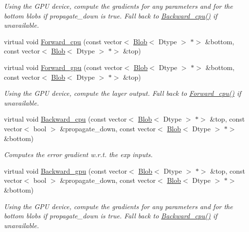 \begin{DoxyCompactItemize}
\begin{DoxyCompactList}\small\item\em Using the G\+PU device, compute the gradients for any parameters and for the bottom blobs if propagate\+\_\+down is true. Fall back to \mbox{\hyperlink{classcaffe_1_1_exp_layer_a3629dc4ebe692252f28edc204b8bf435}{Backward\+\_\+cpu()}} if unavailable. \end{DoxyCompactList}\item 
virtual void \mbox{\hyperlink{classcaffe_1_1_exp_layer_a5decf455b77628d5b2f996c26178153e}{Forward\+\_\+cpu}} (const vector$<$ \mbox{\hyperlink{classcaffe_1_1_blob}{Blob}}$<$ Dtype $>$ $\ast$$>$ \&bottom, const vector$<$ \mbox{\hyperlink{classcaffe_1_1_blob}{Blob}}$<$ Dtype $>$ $\ast$$>$ \&top)
\item 
\mbox{\label{classcaffe_1_1_exp_layer_a5e4d78781ca2c27bce9c45601ffdb2ca}} 
virtual void \mbox{\hyperlink{classcaffe_1_1_exp_layer_a5e4d78781ca2c27bce9c45601ffdb2ca}{Forward\+\_\+gpu}} (const vector$<$ \mbox{\hyperlink{classcaffe_1_1_blob}{Blob}}$<$ Dtype $>$ $\ast$$>$ \&bottom, const vector$<$ \mbox{\hyperlink{classcaffe_1_1_blob}{Blob}}$<$ Dtype $>$ $\ast$$>$ \&top)
\begin{DoxyCompactList}\small\item\em Using the G\+PU device, compute the layer output. Fall back to \mbox{\hyperlink{classcaffe_1_1_exp_layer_af623edf2518145ad490baebdda9efe92}{Forward\+\_\+cpu()}} if unavailable. \end{DoxyCompactList}\item 
virtual void \mbox{\hyperlink{classcaffe_1_1_exp_layer_a9228ea6cd838fb554552118265fe860a}{Backward\+\_\+cpu}} (const vector$<$ \mbox{\hyperlink{classcaffe_1_1_blob}{Blob}}$<$ Dtype $>$ $\ast$$>$ \&top, const vector$<$ bool $>$ \&propagate\+\_\+down, const vector$<$ \mbox{\hyperlink{classcaffe_1_1_blob}{Blob}}$<$ Dtype $>$ $\ast$$>$ \&bottom)
\begin{DoxyCompactList}\small\item\em Computes the error gradient w.\+r.\+t. the exp inputs. \end{DoxyCompactList}\item 
\mbox{\label{classcaffe_1_1_exp_layer_aa5c6dde86812f0103ab153293c0f68b0}} 
virtual void \mbox{\hyperlink{classcaffe_1_1_exp_layer_aa5c6dde86812f0103ab153293c0f68b0}{Backward\+\_\+gpu}} (const vector$<$ \mbox{\hyperlink{classcaffe_1_1_blob}{Blob}}$<$ Dtype $>$ $\ast$$>$ \&top, const vector$<$ bool $>$ \&propagate\+\_\+down, const vector$<$ \mbox{\hyperlink{classcaffe_1_1_blob}{Blob}}$<$ Dtype $>$ $\ast$$>$ \&bottom)
\begin{DoxyCompactList}\small\item\em Using the G\+PU device, compute the gradients for any parameters and for the bottom blobs if propagate\+\_\+down is true. Fall back to \mbox{\hyperlink{classcaffe_1_1_exp_layer_a3629dc4ebe692252f28edc204b8bf435}{Backward\+\_\+cpu()}} if unavailable. \end{DoxyCompactList}\end{DoxyCompactItemize}
